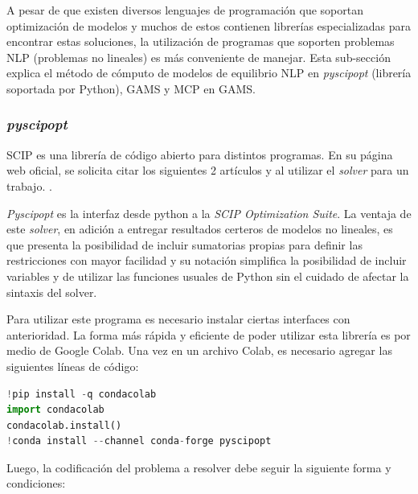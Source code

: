 A pesar de que existen diversos lenguajes de programación que soportan optimización de modelos y muchos de estos contienen librerías especializadas para encontrar estas soluciones, la utilización de programas que soporten problemas NLP (problemas no lineales) es más conveniente de manejar. Esta sub-sección explica el método de cómputo de modelos de equilibrio NLP en \textit{pyscipopt} (librería soportada por Python), GAMS y MCP en GAMS.

\subsubsection{\textit{pyscipopt}}

SCIP es una librería de código abierto para distintos programas. En su página web oficial, se solicita citar los siguientes 2 artículos 
y  al utilizar el \textit{solver} para un trabajo. . 
\vspace{2.5mm}

\textit{Pyscipopt} es la interfaz desde python a la \textit{SCIP Optimization Suite}. La ventaja de este \textit{solver}, en adición a entregar resultados certeros de modelos no lineales, es que presenta la posibilidad de incluir sumatorias propias para definir las restricciones con mayor facilidad y su notación simplifica la posibilidad de incluir variables y de utilizar las funciones usuales de Python sin el cuidado de afectar la sintaxis del solver.
\vspace{2.5mm}

Para utilizar este programa es necesario instalar ciertas interfaces con anterioridad. La forma más rápida y eficiente de poder utilizar esta librería es por medio de Google Colab. Una vez en un archivo Colab, es necesario agregar las siguientes líneas de código:


\begin{lstlisting}[language=Python]
!pip install -q condacolab
import condacolab            
condacolab.install()
!conda install --channel conda-forge pyscipopt
\end{lstlisting}
 
Luego, la codificación del problema a resolver debe seguir la siguiente forma y condiciones:

